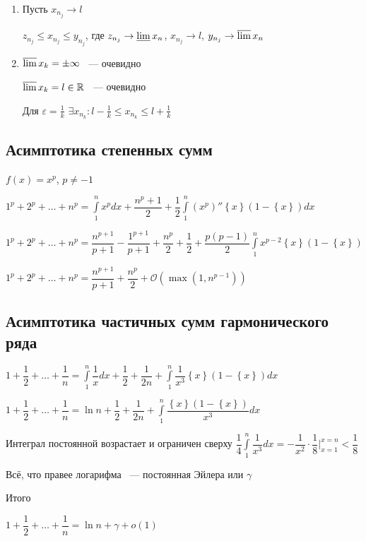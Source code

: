 \documentclass[../main.tex]{subfiles}
\begin{document}
            \begin{enumerate}
            
                \item Пусть $x_{n_j} \rightarrow l$
                
                    $z_{n_j} \leq x_{n_j} \leq y_{n_j}$, где $z_{n_j} \rightarrow \varliminf x_n$, $x_{n_j} \rightarrow l$, $y_{n_j} \rightarrow \varlimsup x_n$
                    
                \item $\varlimsup x_k = \pm \infty$ ~--- очевидно
                
                    $\varlimsup x_k = l \in \mathbb{R}$ ~--- очевидно
                    
                    Для $\varepsilon = \frac{1}{k}$ $\exists x_{n_k} : l - \frac{1}{k} \leq x_{n_k} \leq l + \frac{1}{k}$
                    
            \end{enumerate}
\newpage


\subsection{Асимптотика степенных сумм}
$f(x) = x^p$, $p \neq -1$
        
        $1^p + 2^p + \ldots + n^p = \int\limits^n_1 x^p dx + \dfrac{n^p + 1}{2} + \dfrac{1}{2} \int\limits^n_1 (x^p)'' \left\{ x \right\} (1 - \left\{ x \right\}) dx$
            
        $1^p + 2^p + \ldots + n^p = \dfrac{n^{p + 1}}{p + 1} - \dfrac{1^{p + 1}}{p + 1} + \dfrac{n^p}{2} + \dfrac{1}{2} + \dfrac{p(p - 1)}{2} \int\limits^n_1 x^{p - 2} \left\{ x \right\} (1 - \left\{ x \right\})$
            
        $1^p + 2^p + \ldots + n^p = \dfrac{n^{p + 1}}{p + 1} + \dfrac{n^p}{2} + \mathcal{O}(\max(1, n^{p - 1}))$
\newpage


\subsection{Асимптотика частичных сумм гармонического ряда}

        $1 + \dfrac{1}{2} + \ldots + \dfrac{1}{n} = \int\limits^n_1 \dfrac{1}{x} dx + \dfrac{1}{2} + \dfrac{1}{2n} + \int\limits^n_1 \dfrac{1}{x^3} \left\{ x \right\}(1 - \left\{ x \right\}) dx$
        
        $1 + \dfrac{1}{2} + \ldots + \dfrac{1}{n} = \ln n + \dfrac{1}{2} + \dfrac{1}{2n} + \int\limits^n_1 \dfrac{\left\{ x \right\}(1 - \left\{ x \right\})}{x^3} dx$
        
        Интеграл постоянной возрастает и ограничен сверху $\dfrac{1}{4} \int\limits^n_1 \dfrac{1}{x^3} dx = -\dfrac{1}{x^2} \cdot \dfrac{1}{8} \bigg|^{x = n}_{x = 1} < \dfrac{1}{8}$
        
        Всё, что правее логарифма ~--- постоянная Эйлера или $\gamma$
        
        Итого
        
        $1 + \dfrac{1}{2} + \ldots + \dfrac{1}{n} = \ln {n} + \gamma + o(1)$
\newpage
\end{document}
